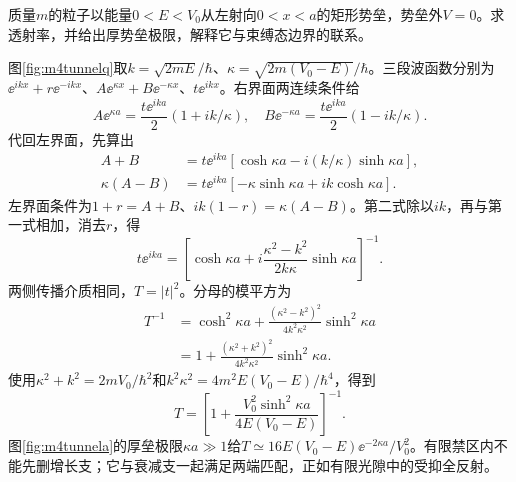 \begin{exercise}\label{ex:m4tunnel}
质量$m$的粒子以能量$0<E<V_0$从左射向$0<x<a$的矩形势垒，势垒外$V=0$。求透射率，并给出厚势垒极限，解释它与束缚态边界的联系。
\end{exercise}
\begin{solution}
图\ref{fig:m4tunnelq}取$k=\sqrt{2mE}/\hbar$、$\kappa=\sqrt{2m(V_0-E)}/\hbar$。三段波函数分别为$\ee^{ikx}+r\ee^{-ikx}$、$A\ee^{\kappa x}+B\ee^{-\kappa x}$、$t\ee^{ikx}$。右界面两连续条件给
\[
 A\ee^{\kappa a}=\frac{t\ee^{ika}}2(1+ik/\kappa),\quad
 B\ee^{-\kappa a}=\frac{t\ee^{ika}}2(1-ik/\kappa).
\]
代回左界面，先算出
\begin{align*}
 A+B&=t\ee^{ika}[\cosh\kappa a-i(k/\kappa)\sinh\kappa a],\\
 \kappa(A-B)&=t\ee^{ika}[-\kappa\sinh\kappa a+ik\cosh\kappa a].
\end{align*}
左界面条件为$1+r=A+B$、$ik(1-r)=\kappa(A-B)$。第二式除以$ik$，再与第一式相加，消去$r$，得
\[
 t\ee^{ika}=\left[\cosh\kappa a+
 i\frac{\kappa^2-k^2}{2k\kappa}\sinh\kappa a\right]^{-1}.
\]
两侧传播介质相同，$T=|t|^2$。分母的模平方为
\begin{align*}
 T^{-1}&=\cosh^2\kappa a+
 \frac{(\kappa^2-k^2)^2}{4k^2\kappa^2}\sinh^2\kappa a\\
 &=1+\frac{(\kappa^2+k^2)^2}{4k^2\kappa^2}\sinh^2\kappa a.
\end{align*}
使用$\kappa^2+k^2=2mV_0/\hbar^2$和$k^2\kappa^2=4m^2E(V_0-E)/\hbar^4$，得到
\[
 T=\left[1+\frac{V_0^2\sinh^2\kappa a}{4E(V_0-E)}\right]^{-1}.
\]
图\ref{fig:m4tunnela}的厚垒极限$\kappa a\gg1$给$T\simeq16E(V_0-E)\ee^{-2\kappa a}/V_0^2$。有限禁区内不能先删增长支；它与衰减支一起满足两端匹配，正如有限光隙中的受抑全反射。
\end{solution}

